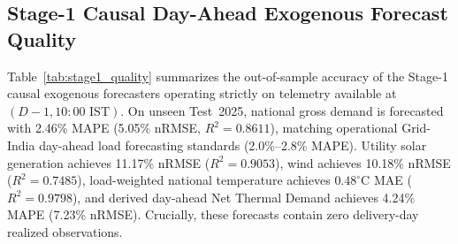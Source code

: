 \documentclass[runningheads,a4paper]{llncs}
\begin{document}
\subsection{Stage-1 Causal Day-Ahead Exogenous Forecast Quality}
Table~\ref{tab:stage1_quality} summarizes the out-of-sample accuracy of the Stage-1 causal exogenous forecasters operating strictly on telemetry available at $(D-1, 10:00\text{~IST})$. On unseen Test~2025, national gross demand is forecasted with 2.46\% MAPE (5.05\% nRMSE, $R^2 = 0.8611$), matching operational Grid-India day-ahead load forecasting standards (2.0\%--2.8\% MAPE). Utility solar generation achieves 11.17\% nRMSE ($R^2 = 0.9053$), wind achieves 10.18\% nRMSE ($R^2 = 0.7485$), load-weighted national temperature achieves $0.48^\circ\text{C}$ MAE ($R^2 = 0.9798$), and derived day-ahead Net Thermal Demand achieves 4.24\% MAPE (7.23\% nRMSE). Crucially, these forecasts contain zero delivery-day realized observations.

\begin{table}[!t]
\centering
\caption{Out-of-Sample Accuracy of Stage-1 Strictly Causal Day-Ahead Exogenous Forecast Reconstructors (Cutoff $\le D-1$ 10:00 AM IST)}
\label{tab:stage1_quality}
\renewcommand{\arraystretch}{1.18}
\setlength{\tabcolsep}{5pt}
\end{table}
\end{document}
